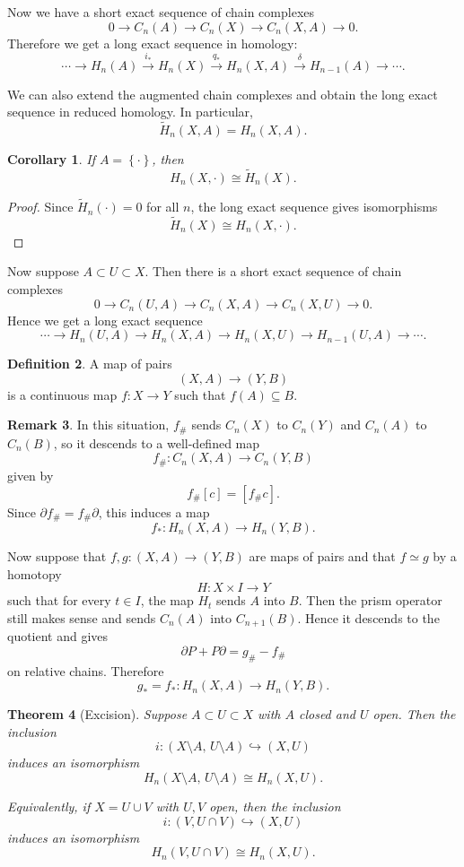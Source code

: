 \documentclass[11pt,a4paper]{article}
\theoremstyle{definition}
\newtheorem{definition}{Definition}[section]
\newtheorem{remark}[definition]{Remark}
\theoremstyle{plain}
\newtheorem{theorem}[definition]{Theorem}
\newtheorem{corollary}[definition]{Corollary}
\theoremstyle{remark}
\renewcommand{\set}[1]{\left\{ #1 \right\}}
\newcommand{\1}{\mathbbm{1}}
\begin{document}
Now we have a short exact sequence of chain complexes
\[
0\to C_n(A)\to C_n(X)\to C_n(X,A)\to 0.
\]
Therefore we get a long exact sequence in homology:
\[
\cdots \to H_n(A)\xrightarrow{i_*} H_n(X)\xrightarrow{q_*} H_n(X,A)\xrightarrow{\delta} H_{n-1}(A)\to \cdots.
\]

We can also extend the augmented chain complexes and obtain the long exact sequence in reduced homology. In particular,
\[
\widetilde{H}_n(X,A)=H_n(X,A).
\]

\begin{corollary}
    If $A=\set{\cdot}$, then
    \[
    H_n(X,\cdot)\cong \widetilde{H}_n(X).
    \]
\end{corollary}

\begin{proof}
    Since $\widetilde{H}_n(\cdot)=0$ for all $n$, the long exact sequence gives isomorphisms
    \[
    \widetilde{H}_n(X)\cong H_n(X,\cdot).
    \]
\end{proof}

Now suppose $A\subset U\subset X$. Then there is a short exact sequence of chain complexes
\[
0\to C_n(U,A)\to C_n(X,A)\to C_n(X,U)\to 0.
\]
Hence we get a long exact sequence
\[
\cdots \to H_n(U,A)\to H_n(X,A)\to H_n(X,U)\to H_{n-1}(U,A)\to \cdots.
\]

\begin{definition}
    A map of pairs
    \[
    (X,A)\to (Y,B)
    \]
    is a continuous map $f\colon X\to Y$ such that $f(A)\subseteq B$.
\end{definition}

\begin{remark}
    In this situation, $f_\#$ sends $C_n(X)$ to $C_n(Y)$ and $C_n(A)$ to $C_n(B)$, so it descends to a well-defined map
    \[
    f_\# \colon C_n(X,A)\to C_n(Y,B)
    \]
    given by
    \[
    f_\#[c]=[f_\# c].
    \]
    Since $\partial f_\# = f_\#\partial$, this induces a map
    \[
    f_* \colon H_n(X,A)\to H_n(Y,B).
    \]
\end{remark}

Now suppose that $f,g\colon (X,A)\to (Y,B)$ are maps of pairs and that $f\simeq g$ by a homotopy
\[
H\colon X\times I\to Y
\]
such that for every $t\in I$, the map $H_t$ sends $A$ into $B$. Then the prism operator still makes sense and sends
$C_n(A)$ into $C_{n+1}(B)$. Hence it descends to the quotient and gives
\[
\partial P + P\partial = g_\# - f_\#
\]
on relative chains. Therefore
\[
g_* = f_* \colon H_n(X,A)\to H_n(Y,B).
\]

\begin{theorem}[Excision]
    Suppose $A\subset U\subset X$ with $A$ closed and $U$ open. Then the inclusion
    \[
    i\colon (X\setminus A,\, U\setminus A)\hookrightarrow (X,U)
    \]
    induces an isomorphism
    \[
    H_n(X\setminus A,\, U\setminus A)\cong H_n(X,U).
    \]

    Equivalently, if $X=U\cup V$ with $U,V$ open, then the inclusion
    \[
    i\colon (V,U\cap V)\hookrightarrow (X,U)
    \]
    induces an isomorphism
    \[
    H_n(V,U\cap V)\cong H_n(X,U).
    \]
\end{theorem}
\end{document}
